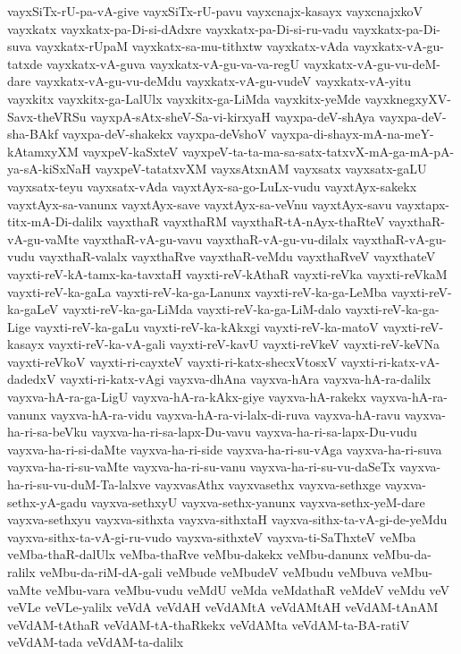 {vayxSiTx-rU-pa-vA-give
vayxSiTx-rU-pavu
vayxcnajx-kasayx
vayxcnajxkoV
vayxkatx
vayxkatx-pa-Di-si-dAdxre
vayxkatx-pa-Di-si-ru-vadu
vayxkatx-pa-Di-suva
vayxkatx-rUpaM
vayxkatx-sa-mu-tithxtw
vayxkatx-vAda
vayxkatx-vA-gu-tatxde
vayxkatx-vA-guva
vayxkatx-vA-gu-va-va-regU
vayxkatx-vA-gu-vu-deM-dare
vayxkatx-vA-gu-vu-deMdu
vayxkatx-vA-gu-vudeV
vayxkatx-vA-yitu
vayxkitx
vayxkitx-ga-LalUlx
vayxkitx-ga-LiMda
vayxkitx-yeMde
vayxknegxyXV-Savx-theVRSu
vayxpA-sAtx-sheV-Sa-vi-kirxyaH
vayxpa-deV-shAya
vayxpa-deV-sha-BAkf
vayxpa-deV-shakekx
vayxpa-deVshoV
vayxpa-di-shayx-mA-na-meY-kAtamxyXM
vayxpeV-kaSxteV
vayxpeV-ta-ta-ma-sa-satx-tatxvX-mA-ga-mA-pA-ya-sA-kiSxNaH
vayxpeV-tatatxvXM
vayxsAtxnAM
vayxsatx
vayxsatx-gaLU
vayxsatx-teyu
vayxsatx-vAda
vayxtAyx-sa-go-LuLx-vudu
vayxtAyx-sakekx
vayxtAyx-sa-vanunx
vayxtAyx-save
vayxtAyx-sa-veVnu
vayxtAyx-savu
vayxtapx-titx-mA-Di-dalilx
vayxthaR
vayxthaRM
vayxthaR-tA-nAyx-thaRteV
vayxthaR-vA-gu-vaMte
vayxthaR-vA-gu-vavu
vayxthaR-vA-gu-vu-dilalx
vayxthaR-vA-gu-vudu
vayxthaR-valalx
vayxthaRve
vayxthaR-veMdu
vayxthaRveV
vayxthateV
vayxti-reV-kA-tamx-ka-tavxtaH
vayxti-reV-kAthaR
vayxti-reVka
vayxti-reVkaM
vayxti-reV-ka-gaLa
vayxti-reV-ka-ga-Lanunx
vayxti-reV-ka-ga-LeMba
vayxti-reV-ka-gaLeV
vayxti-reV-ka-ga-LiMda
vayxti-reV-ka-ga-LiM-dalo
vayxti-reV-ka-ga-Lige
vayxti-reV-ka-gaLu
vayxti-reV-ka-kAkxgi
vayxti-reV-ka-matoV
vayxti-reV-kasayx
vayxti-reV-ka-vA-gali
vayxti-reV-kavU
vayxti-reVkeV
vayxti-reV-keVNa
vayxti-reVkoV
vayxti-ri-cayxteV
vayxti-ri-katx-shecxVtosxV
vayxti-ri-katx-vA-dadedxV
vayxti-ri-katx-vAgi
vayxva-dhAna
vayxva-hAra
vayxva-hA-ra-dalilx
vayxva-hA-ra-ga-LigU
vayxva-hA-ra-kAkx-giye
vayxva-hA-rakekx
vayxva-hA-ra-vanunx
vayxva-hA-ra-vidu
vayxva-hA-ra-vi-lalx-di-ruva
vayxva-hA-ravu
vayxva-ha-ri-sa-beVku
vayxva-ha-ri-sa-lapx-Du-vavu
vayxva-ha-ri-sa-lapx-Du-vudu
vayxva-ha-ri-si-daMte
vayxva-ha-ri-side
vayxva-ha-ri-su-vAga
vayxva-ha-ri-suva
vayxva-ha-ri-su-vaMte
vayxva-ha-ri-su-vanu
vayxva-ha-ri-su-vu-daSeTx
vayxva-ha-ri-su-vu-duM-Ta-lalxve
vayxvasAthx
vayxvasethx
vayxva-sethxge
vayxva-sethx-yA-gadu
vayxva-sethxyU
vayxva-sethx-yanunx
vayxva-sethx-yeM-dare
vayxva-sethxyu
vayxva-sithxta
vayxva-sithxtaH
vayxva-sithx-ta-vA-gi-de-yeMdu
vayxva-sithx-ta-vA-gi-ru-vudo
vayxva-sithxteV
vayxva-ti-SaThxteV
veMba
veMba-thaR-dalUlx
veMba-thaRve
veMbu-dakekx
veMbu-danunx
veMbu-da-ralilx
veMbu-da-riM-dA-gali
veMbude
veMbudeV
veMbudu
veMbuva
veMbu-vaMte
veMbu-vara
veMbu-vudu
veMdU
veMda
veMdathaR
veMdeV
veMdu
veV
veVLe
veVLe-yalilx
veVdA
veVdAH
veVdAMtA
veVdAMtAH
veVdAM-tAnAM
veVdAM-tAthaR
veVdAM-tA-thaRkekx
veVdAMta
veVdAM-ta-BA-ratiV
veVdAM-tada
veVdAM-ta-dalilx
}
